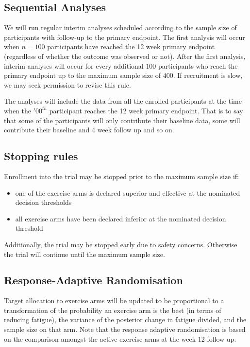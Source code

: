 \documentclass[
]{article}
\providecommand{\tightlist}{%
  \setlength{\itemsep}{0pt}\setlength{\parskip}{0pt}}
\begin{document}
\hypertarget{sequential-analyses}{%
  \subsection{Sequential Analyses}\label{sequential-analyses}}

We will run regular interim analyses scheduled according to the sample size of participants with follow-up to the primary endpoint.
The first analysis will occur when \(n=100\) participants have reached the 12 week primary endpoint (regardless of whether the outcome was observed or not).
After the first analysis, interim analyses will occur for every additional \(100\) participants who reach the primary endpoint up to the maximum sample size of \(400\).
If recruitment is slow, we may seek permission to revise this rule.

The analyses will include the data from all the enrolled participants at the time when the $'00^{th}$ participant reaches the 12 week primary endpoint.
That is to say that some of the participants will only contribute their baseline data, some will contribute their baseline and 4 week follow up and so on.

\hypertarget{stopping-rules}{%
  \subsection{Stopping rules}\label{stopping-rules}}

Enrollment into the trial may be stopped prior to the maximum sample size if:

\begin{itemize}\tightlist
  \item one of the exercise arms is declared superior and effective at the nominated decision thresholds
  \item all exercise arms have been declared inferior at the nominated decision threshold
\end{itemize}

Additionally, the trial may be stopped early due to safety concerns.
Otherwise the trial will continue until the maximum sample size.

\hypertarget{response-adaptive-randomisation}{%
  \subsection{Response-Adaptive Randomisation}\label{response-adaptive-randomisation}}

Target allocation to exercise arms will be updated to be proportional to a transformation of the probability an exercise arm is the best (in terms of reducing fatigue), the variance of the posterior change in fatigue divided, and the sample size on that arm.
Note that the response adaptive randomisation is based on the comparison amongst the active exercise arms at the week 12 follow up.
\end{document}
